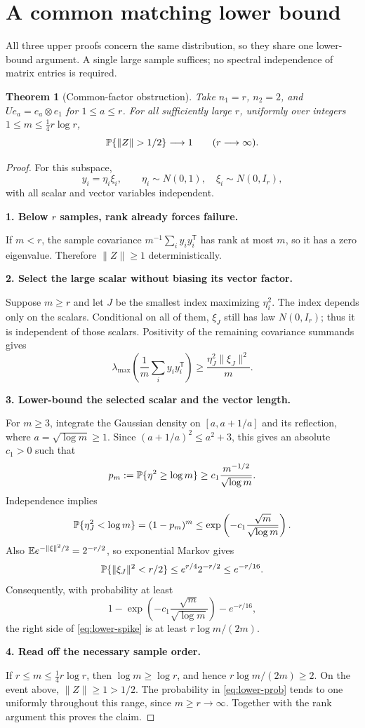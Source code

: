 \documentclass[11pt]{article}
\numberwithin{equation}{section}
\newtheorem{theorem}{Theorem}[section]
\theoremstyle{definition}\newtheorem{definition}[theorem]{Definition}
\theoremstyle{remark}\newtheorem{remark}[theorem]{Remark}
\newcommand{\norm}[1]{\lVert#1\rVert}\newcommand{\ip}[2]{\langle#1,#2\rangle}
\newcommand{\step}[1]{\par\addvspace{.65\baselineskip}\Needspace{4\baselineskip}\noindent\textbf{#1}\par\nobreak\smallskip}
\begin{document}
\section{A common matching lower bound}\label{sec:lower}
All three upper proofs concern the same distribution, so they share one lower-bound
argument. A single large sample suffices; no spectral independence of matrix
entries is required.

\begin{theorem}[Common-factor obstruction]\label{thm:lower}
Take $n_1=r$, $n_2=2$, and $Ue_a=e_a\otimes e_1$ for $1\le a\le r$.
For all sufficiently large $r$, uniformly over integers
$1\le m\le\tfrac14r\log r$,
\[
 \Prob\{\norm Z>1/2\}\longrightarrow1\qquad(r\longrightarrow\infty).
\]
\end{theorem}
\begin{proof}
For this subspace,
\[
 y_i=\eta_i\xi_i,\qquad \eta_i\sim N(0,1),\quad\xi_i\sim N(0,I_r),
\]
with all scalar and vector variables independent.

\step{1. Below $r$ samples, rank already forces failure.}
If $m<r$, the sample covariance $m^{-1}\sum_i y_iy_i^{\mathsf T}$ has rank at
most $m$, so it has a zero eigenvalue. Therefore $\norm Z\ge1$ deterministically.

\step{2. Select the large scalar without biasing its vector factor.}
Suppose $m\ge r$ and let $J$ be the smallest index maximizing $\eta_i^2$.
The index depends only on the scalars. Conditional on all of them, $\xi_J$ still
has law $N(0,I_r)$; thus it is independent of those scalars.
Positivity of the remaining covariance summands gives
\begin{equation}\label{eq:lower-spike}
 \lambda_{\max}\left(\frac1m\sum_i y_iy_i^{\mathsf T}\right)
 \ge\frac{\eta_J^2\norm{\xi_J}^2}{m}.
\end{equation}

\step{3. Lower-bound the selected scalar and the vector length.}
For $m\ge3$, integrate the Gaussian density on
$[a,a+1/a]$ and its reflection, where $a=\sqrt{\log m}\ge1$.
Since $(a+1/a)^2\le a^2+3$, this gives an absolute $c_1>0$ such that
\[
 p_m:=\mathbb P\{\eta^2\ge\log m\}
 \ge c_1\frac{m^{-1/2}}{\sqrt{\log m}}.
\]
Independence implies
\[
 \mathbb P\{\eta_J^2<\log m\}=(1-p_m)^m
 \le\exp\left(-c_1\frac{\sqrt m}{\sqrt{\log m}}\right).
\]
Also $\E e^{-\norm\xi^2/2}=2^{-r/2}$, so exponential Markov gives
\[
 \Prob\{\norm{\xi_J}^2<r/2\}
 \le e^{r/4}2^{-r/2}\le e^{-r/16}.
\]
Consequently, with probability at least
\begin{equation}\label{eq:lower-prob}
 1-\exp\left(-c_1\frac{\sqrt m}{\sqrt{\log m}}\right)-e^{-r/16},
\end{equation}
the right side of \eqref{eq:lower-spike} is at least $r\log m/(2m)$.

\step{4. Read off the necessary sample order.}
If $r\le m\le\tfrac14r\log r$, then $\log m\ge\log r$, and hence
$r\log m/(2m)\ge2$. On the event above, $\norm Z\ge1>1/2$.
The probability in \eqref{eq:lower-prob} tends to one uniformly throughout this
range, since $m\ge r\to\infty$. Together with the rank argument this proves the
claim.
\end{proof}
\end{document}
